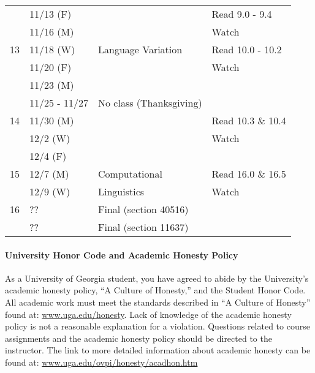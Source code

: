 \documentclass{article}
\begin{document}
\begin{longtable}{c l l | l}
            & 11/13 (F)   &                                 & Read 9.0 - 9.4\\
            & 11/16 (M)   &                                 & Watch\\
      \hline
      13    & 11/18 (W)   & Language Variation              & Read 10.0 - 10.2\\
            & 11/20 (F)   &                                 & Watch\\
            & 11/23 (M)   &                                 & \\
            & 11/25 - 11/27 & No class (Thanksgiving)       & \\
      \hline
      14    & 11/30 (M)   &                                 & Read 10.3 \& 10.4\\
            & 12/2 (W)    &                                 & Watch\\
            & 12/4 (F)    &                                 & \\
      \hline
      15    & 12/7 (M)    & Computational                   & Read 16.0 \& 16.5\\
            & 12/9 (W)    & Linguistics                     & Watch\\
      \hline
      16    & ??          & Final (section 40516)           & \\
            & ??          & Final (section 11637)           &
    \end{longtable}

  \paragraph{University Honor Code and Academic Honesty Policy}
    As a University of Georgia student, you have agreed to abide by the University’s academic honesty policy, ``A Culture of Honesty,'' and the Student Honor Code. All academic work must meet the standards described in ``A Culture of Honesty'' found at: \url{www.uga.edu/honesty}. Lack of knowledge of the academic honesty policy is not a reasonable explanation for a violation. Questions related to course assignments and the academic honesty policy should be directed to the instructor. The link to more detailed information about academic honesty can be found at: \url{www.uga.edu/ovpi/honesty/acadhon.htm}
\end{document}
